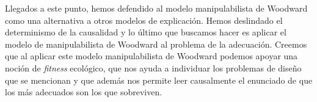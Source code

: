 Llegados a este punto, hemos defendido al modelo manipulabilista de Woodward como una alternativa a otros modelos de explicación. Hemos deslindado el determinismo de la causalidad y lo último que buscamos hacer es aplicar el modelo de manipulabilista de Woodward al problema de la adecuación. Creemos que al aplicar este modelo manipulabilista de Woodward podemos apoyar una noción de \emph{fitness} ecológico, que nos ayuda a individuar los problemas de diseño que se mencionan y que además nos permite leer causalmente el enunciado de que los más adecuados son los que sobreviven.



